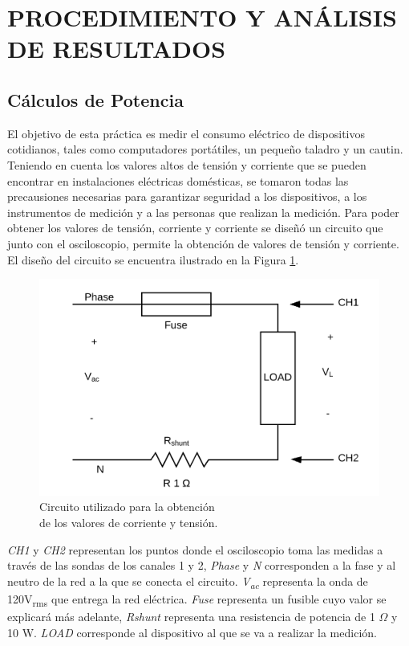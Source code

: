 \documentclass[journal]{IEEEtran}
\begin{document}

\section{PROCEDIMIENTO Y ANÁLISIS DE RESULTADOS}

\subsection{Cálculos de Potencia}

El objetivo de esta práctica es medir el consumo eléctrico 
de dispositivos cotidianos, tales como computadores 
portátiles, un pequeño taladro y un cautin. Teniendo en 
cuenta los valores altos de tensión y corriente que se 
pueden encontrar en instalaciones eléctricas domésticas, se
tomaron todas las precausiones necesarias para garantizar 
seguridad a los dispositivos, a los instrumentos de 
medición y a las personas que realizan la medición. 
Para poder obtener los valores de tensión, corriente y 
corriente se 
diseñó un circuito que junto con el osciloscopio, 
permite la obtención de valores de tensión y corriente. El 
diseño del circuito se encuentra ilustrado en la Figura 
\ref{circuit_diagram}. 

\begin{figure}[h]
\centering
\includegraphics[clip,width=0.7\columnwidth]{circuit_diagram.png}
\caption{Circuito utilizado para la obtención \\
de los valores de corriente y tensión.}
\label{circuit_diagram}
\end{figure}

\textit{CH1} y \textit{CH2} representan los puntos donde
el osciloscopio toma las medidas a través de las 
sondas de los canales 1 y 2,
\textit{Phase} y \textit{N} corresponden a la fase y 
al neutro de la red a la que se conecta el circuito. 
\textit{V\textsubscript{ac}} representa 
la onda de 120V\textsubscript{rms} 
que entrega la red eléctrica. 
\textit{Fuse} representa un fusible cuyo valor se explicará 
más adelante, \textit{Rshunt} representa una resistencia 
de potencia de 1 $\Omega$ y 10 W. \textit{LOAD} corresponde
al dispositivo al que se va a realizar la
medición.\\ 
\end{document}
